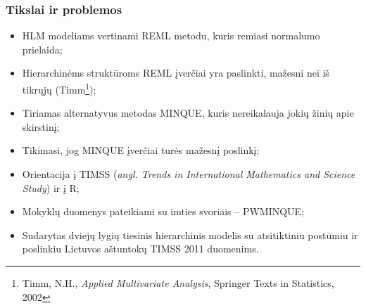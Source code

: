 \documentclass[utf8,hyperref={unicode,pdftex}]{beamer}
\begin{document}
\begin{frame}
\frametitle{Tikslai ir problemos}
\begin{itemize}
\item HLM modeliams vertinami REML metodu, kuris remiasi normalumo prielaida;
\item Hierarchinėms struktūroms REML įverčiai yra paslinkti, mažesni nei iš tikrųjų (Timm\footnote{Timm, N.H., \textit{Applied Multivariate Analysis}, Springer Texts in Statistics, 2002});
\item Tiriamas alternatyvus metodas MINQUE, kuris nereikalauja jokių žinių apie skirstinį;
\item Tikimasi, jog MINQUE įverčiai turės mažesnį poslinkį;
\item Orientacija į TIMSS (\textit{angl. Trends in International Mathematics and Science Study}) ir į R;
\item Mokyklų duomenys pateikiami su imties svoriais -- PWMINQUE;
\item Sudarytas dviejų lygių tiesinis hierarchinis modelis su atsitiktiniu postūmiu ir poslinkiu Lietuvos aštuntokų TIMSS 2011 duomenims.
\end{itemize}
\end{frame}
\end{document}
